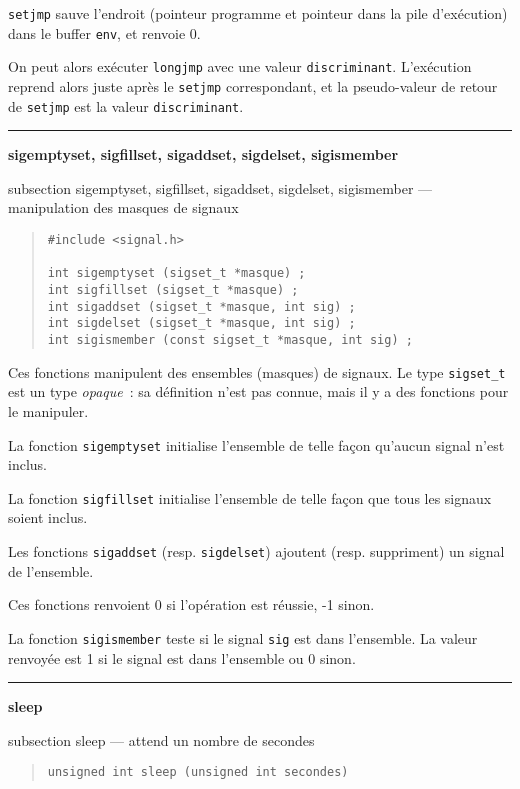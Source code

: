 \documentclass [twoside] {report}
\newcommand {\primitive} [1]
    {
	{\large \bf #1}
	\addcontentsline {toc} {subsection} {#1}
    }
\newcommand {\separation}
    {
	\vspace {7mm}
	\nopagebreak
	\hrule
    }
\begin{document}
{\tt setjmp} sauve l'endroit (pointeur programme et pointeur
dans la pile d'exécution) dans le buffer {\tt env}, et renvoie
0.

On peut alors exécuter {\tt longjmp} avec une valeur
{\tt discriminant}. L'exécution reprend alors juste après le
{\tt setjmp} correspondant, et la pseudo-valeur de retour de
{\tt setjmp} est la valeur {\tt discriminant}.





\separation 
\primitive {sigemptyset, sigfillset, sigaddset, sigdelset, sigismember} ---
manipulation des masques de signaux
    \label {sigsetopts}

\begin {quote}
\begin {verbatim}
#include <signal.h>

int sigemptyset (sigset_t *masque) ;
int sigfillset (sigset_t *masque) ;
int sigaddset (sigset_t *masque, int sig) ;
int sigdelset (sigset_t *masque, int sig) ;
int sigismember (const sigset_t *masque, int sig) ;
\end{verbatim}
\end {quote}

Ces fonctions manipulent des ensembles (masques) de signaux.  Le type
{\tt sigset\_t} est un type {\em opaque}~:  sa définition n'est pas
connue, mais il y a des fonctions pour le manipuler.

La fonction {\tt sigemptyset} initialise l'ensemble de telle façon
qu'aucun signal n'est inclus.

La fonction {\tt sigfillset} initialise l'ensemble de telle façon que
tous les signaux soient inclus.

Les fonctions {\tt sigaddset} (resp. {\tt sigdelset}) ajoutent
(resp. suppriment) un signal de l'ensemble.

Ces fonctions renvoient 0 si l'opération est réussie, -1 sinon.

La fonction {\tt sigismember} teste si le signal {\tt sig} est dans
l'ensemble. La valeur renvoyée est 1 si le signal est dans l'ensemble
ou 0 sinon.



\separation 
\primitive {sleep} --- attend un nombre de secondes

\begin {quote}
\begin {verbatim}
unsigned int sleep (unsigned int secondes)
\end{verbatim}
\end {quote}
\end{document}
